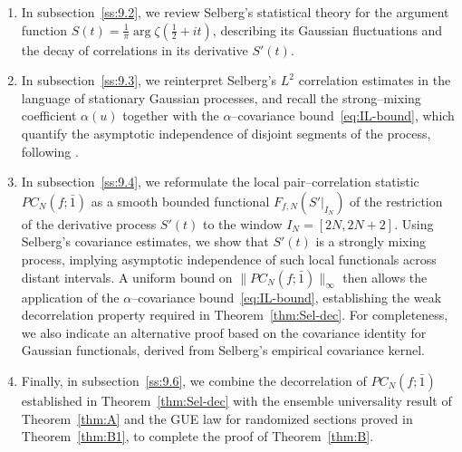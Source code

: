 \documentclass[12pt,reqno]{amsart}
\theoremstyle{plain}
\theoremstyle{definition}
\theoremstyle{remark}
\begin{document}
\begin{enumerate}
\item In subsection~\ref{ss:9.2},  
we review Selberg’s statistical theory for the argument function 
\( S(t)=\tfrac{1}{\pi}\arg\zeta(\tfrac{1}{2}+it) \),  
describing its Gaussian fluctuations and the decay of correlations in its derivative \(S'(t)\).

\item In subsection~\ref{ss:9.3},  
we reinterpret Selberg’s $L^2$ correlation estimates in the language of stationary Gaussian processes, 
and recall the strong–mixing coefficient $\alpha(u)$ together with the 
$\alpha$–covariance bound~\eqref{eq:IL-bound}, 
which quantify the asymptotic independence of disjoint segments of the process, following \cite{IbragimovLinnik1971}.

\item In subsection~\ref{ss:9.4},  
we reformulate the local pair--correlation statistic \(PC_N(f;\bar 1)\)  
as a smooth bounded functional \(F_{f,N}(S'|_{I_N})\)  
of the restriction of the derivative process \(S'(t)\)  
to the window \(I_N=[2N,2N+2]\).  
Using Selberg’s covariance estimates, we show that \(S'(t)\)  
is a strongly mixing process, implying asymptotic independence  
of such local functionals across distant intervals.  
A uniform bound on \(\|PC_N(f;\bar 1)\|_\infty\)  
then allows the application of the
$\alpha$–covariance bound~\eqref{eq:IL-bound},  
establishing the weak decorrelation property required in Theorem~\ref{thm:Sel-dec}.  
For completeness, we also indicate an alternative proof based on  
the covariance identity for Gaussian functionals,  
derived from Selberg’s empirical covariance kernel.


\item Finally, in subsection~\ref{ss:9.6},  
we combine the decorrelation of \(PC_N(f;\bar1)\) established in Theorem~\ref{thm:Sel-dec}  
with the ensemble universality result of Theorem~\ref{thm:A}  
and the GUE law for randomized sections proved in Theorem~\ref{thm:B1},  
to complete the proof of Theorem~\ref{thm:B}.
\end{enumerate}
\end{document}
